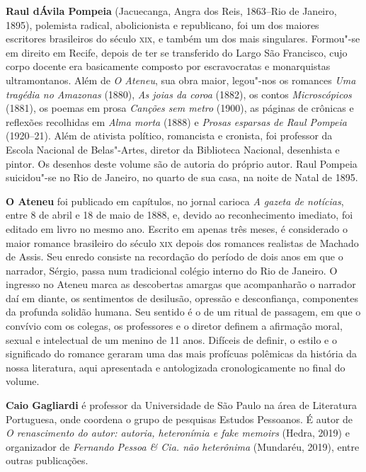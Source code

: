 \textbf{Raul dÁvila Pompeia} (Jacuecanga, Angra dos Reis, 1863--Rio de Janeiro, 1895), 
polemista radical, abolicionista e republicano, foi um dos maiores escritores
brasileiros do século \textsc{xix}, e também um dos mais singulares. Formou"-se
em direito em Recife, depois de ter se transferido do Largo São
Francisco, cujo corpo docente era basicamente composto por
escravocratas e monarquistas ultramontanos. Além de \textit{O
Ateneu}, sua obra maior, legou"-nos os romances
\textit{Uma tragédia no Amazonas} (1880),
\textit{As joias da coroa} (1882), os contos
\textit{Microscópicos} (1881), os poemas em
prosa \textit{Canções sem metro} (1900), as páginas de crônicas 
e reflexões recolhidas em \textit{Alma
morta} (1888) e \textit{Prosas esparsas de
Raul Pompeia} (1920--21). Além de ativista político,
romancista e cronista, foi professor da Escola
Nacional de Belas"-Artes, diretor da Biblioteca Nacional, desenhista e
pintor. Os desenhos deste volume são de autoria do próprio autor. Raul
Pompeia suicidou"-se no Rio de Janeiro, no quarto de sua casa, na
noite de Natal de 1895.


\textbf{O Ateneu} foi publicado em capítulos,
no jornal carioca \textit{A gazeta de
notícias}, entre 8 de abril e 18 de maio de 1888, e,
devido ao reconhecimento imediato, foi editado em livro no mesmo ano.
Escrito em apenas três meses, é considerado o maior romance brasileiro do
século \textsc{xix} depois dos romances realistas de Machado de Assis. Seu
enredo consiste na recordação do período de dois anos em que o narrador,
Sérgio, passa num tradicional colégio interno do Rio de Janeiro. O
ingresso no Ateneu marca as descobertas amargas que acompanharão o
narrador daí em diante, os sentimentos de desilusão, opressão e
desconfiança, componentes da profunda solidão humana. Seu sentido é o
de um ritual de passagem, em que o convívio com os colegas, os
professores e o diretor definem a afirmação moral, sexual e intelectual
de um menino de 11 anos. Difíceis de definir, o estilo e o
significado do romance geraram uma das mais profícuas polêmicas da
história da nossa literatura, aqui apresentada e antologizada
cronologicamente no final do volume.


\textbf{Caio Gagliardi} é professor da Universidade de São Paulo na área de Literatura Portuguesa, onde coordena o grupo de pesquisas Estudos Pessoanos. É autor de \emph{O renascimento do autor: autoria, heteronímia e fake memoirs} (Hedra, 2019) e organizador de \emph{Fernando Pessoa \& Cia. não heterônima} (Mundaréu, 2019), entre outras publicações. 



